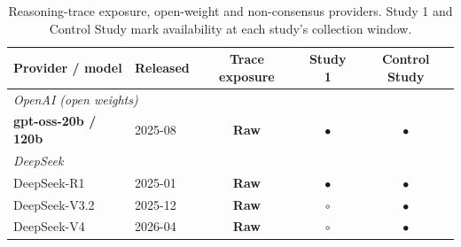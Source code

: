 \documentclass[manuscript,review,anonymous]{acmart}
\newcommand{\nf}[1]{\textcolor{colornotfinal}{#1}} %
\begin{document}
\begin{table}[H]
\centering
\footnotesize
\caption{Reasoning-trace exposure, open-weight and non-consensus providers.
Study 1 and Control Study mark availability at each study's collection window.}
\label{tab:providers_open}
\begin{tabular}{llccc}
\hline
Provider / model & Released & Trace exposure & Study 1 & Control Study \\ \hline
\multicolumn{5}{l}{\textit{OpenAI (open weights)}~\cite{openai2025harmony,openai2025gptoss}} \\
\quad \textbf{gpt-oss-20b / 120b} & 2025-08 & \textbf{Raw}  & $\bullet$ & $\bullet$ \\
\multicolumn{5}{l}{\textit{DeepSeek}~\cite{deepseek2025r1card,deepseek2025r1release,deepseek2025v32card,deepseek2026v4card,deepseek2025thinking}} \\
\quad DeepSeek-R1           & 2025-01 & \textbf{Raw}  & $\bullet$ & $\bullet$ \\
\quad DeepSeek-V3.2         & 2025-12 & \textbf{Raw}        & $\circ$   & $\bullet$ \\
\quad DeepSeek-V4           & 2026-04 & \textbf{Raw}        & $\circ$   & $\bullet$ \\




\end{tabular}
\end{table}
\end{document}

